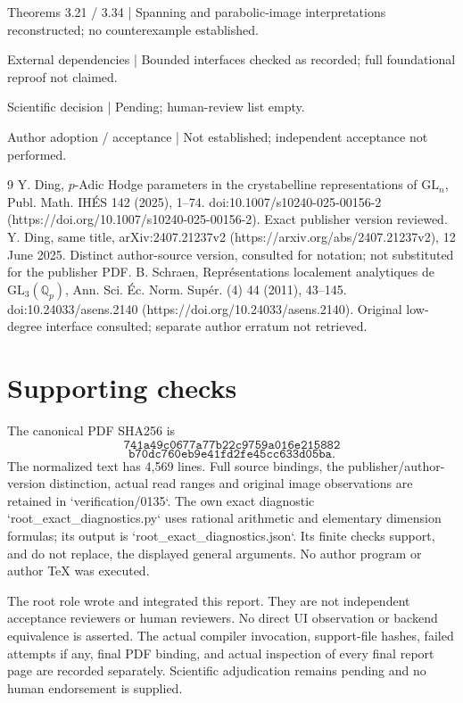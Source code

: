 \documentclass[10pt]{article}
\begin{document}
Theorems 3.21 / 3.34 | Spanning and parabolic-image interpretations reconstructed; no counterexample established.\par
External dependencies | Bounded interfaces checked as recorded; full foundational reproof not claimed.\par
Scientific decision | Pending; human-review list empty.\par
Author adoption / acceptance | Not established; independent acceptance not performed.\par
9 Y. Ding, \(p\)-Adic Hodge parameters in the crystabelline representations of \(\mathrm{GL}_n\), Publ. Math. IHÉS 142 (2025), 1–74. doi:10.1007/s10240-025-00156-2 (https://doi.org/10.1007/s10240-025-00156-2). Exact publisher version reviewed. Y. Ding, same title, arXiv:2407.21237v2 (https://arxiv.org/abs/2407.21237v2), 12 June 2025. Distinct author-source version, consulted for notation; not substituted for the publisher PDF. B. Schraen, Représentations localement analytiques de \(\mathrm{GL}_3(\mathbb Q_p)\), Ann. Sci. Éc. Norm. Supér. (4) 44 (2011), 43–145. doi:10.24033/asens.2140 (https://doi.org/10.24033/asens.2140). Original low-degree interface consulted; separate author erratum not retrieved.\par
\section*{Supporting checks}
The canonical PDF SHA256 is \[\texttt{741a49c0677a77b22c9759a016e215882}\] \[\texttt{b70dc760eb9e41fd2fe45cc633d05ba}.\] The normalized text has 4,569 lines. Full source bindings, the publisher/author-version distinction, actual read ranges and original image observations are retained in `verification/0135`. The own exact diagnostic `root\_exact\_diagnostics.py` uses rational arithmetic and elementary dimension formulas; its output is `root\_exact\_diagnostics.json`. Its finite checks support, and do not replace, the displayed general arguments. No author program or author TeX was executed.\par
The root role wrote and integrated this report. They are not independent acceptance reviewers or human reviewers. No direct UI observation or backend equivalence is asserted. The actual compiler invocation, support-file hashes, failed attempts if any, final PDF binding, and actual inspection of every final report page are recorded separately. Scientific adjudication remains pending and no human endorsement is supplied.\par
\end{document}
